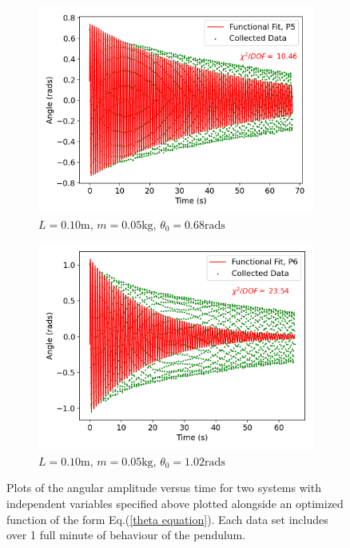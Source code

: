 \begin{figure}[H]
\centering
\begin{subfigure}[t]{0.5\textwidth}
  \centering
  \includegraphics[width=1\textwidth]{Plots/P5.png}
  \caption{\small{$L = 0.10\text{m}$, $m = 0.05\text{kg}$, $\theta_0 = 0.68\text{rads}$}}
  \label{P5}
\end{subfigure}%
\begin{subfigure}[t]{.5\textwidth}
  \centering
  \includegraphics[width=\textwidth]{Plots/P6.png}
  \caption{\small{$L = 0.10\text{m}$, $m = 0.05\text{kg}$, $\theta_0 = 1.02\text{rads}$}}
  \label{P6}
\end{subfigure}
\caption{\small{Plots of the angular amplitude versus time for two systems with independent variables specified above plotted alongside an optimized function of the form Eq.(\ref{theta equation}). Each data set includes over 1 full minute of behaviour of the pendulum.}}
\end{figure}